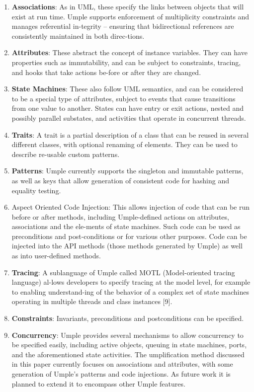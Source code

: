 \begin{enumerate}
 \item 	\textbf{Associations}: As in UML, these specify the links between objects that will exist at run time. Umple supports enforcement of multiplicity constraints and manages referential in-tegrity – ensuring that bidirectional references are consistently maintained in both direc-tions.
 \item 	\textbf{Attributes}: These abstract the concept of instance variables. They can have properties such as immutability, and can be subject to constraints, tracing, and hooks that take actions be-fore or after they are changed.
 \item \textbf{	State Machines}: These also follow UML semantics, and can be considered to be a special type of attributes, subject to events that cause transitions from one value to another. States can have entry or exit actions, nested and possibly parallel substates, and activities that operate in concurrent threads.
 \item 	\textbf{Traits}: A trait is a partial description of a class that can be reused in several different classes, with optional renaming of elements. They can be used to describe re-usable custom patterns.
 \item 	\textbf{Patterns}: Umple currently supports the singleton and immutable patterns, as well as keys that allow generation of consistent code for hashing and equality testing.
 \item 	Aspect Oriented Code Injection: This allows injection of code that can be run before or after methods, including Umple-defined actions on attributes, associations and the ele-ments of state machines. Such code can be used as preconditions and post-conditions or for various other purposes. Code can be injected into the API methods (those methods generated by Umple) as well as into user-defined methods. 
 \item 	\textbf{Tracing}:  A sublanguage of Umple called MOTL (Model-oriented tracing language) al-lows developers to specify tracing at the model level, for example to enabling understand-ing of the behavior of a complex set of state machines operating in multiple threads and class instances [9].
 \item 	\textbf{Constraints}: Invariants, preconditions and postconditions can be specified.
 \item 	\textbf{Concurrency}: Umple provides several mechanisms to allow concurrency to be specified easily, including active objects, queuing in state machines, ports, and the aforementioned state activities.
The umplification method discussed in this paper currently focuses on associations and attributes, with some generation of Umple’s patterns and code injections. As future work it is planned to extend it to encompass other Umple features.
\end{enumerate}
